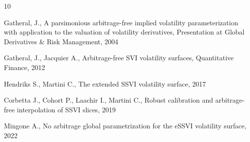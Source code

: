 \documentclass{amsart}
\theoremstyle{plain}
\numberwithin{equation}{section}
\begin{document}
\begin{thebibliography}{10}

 Gatheral, J., A parsimonious arbitrage-free implied volatility parameterization with application to the valuation of volatility derivatives, Presentation at Global Derivatives \& Risk Management, 2004

 Gatheral, J., Jacquier A., Arbitrage-free SVI volatility surfaces, Quantitative Finance, 2012

 Hendriks S., Martini C., The extended SSVI volatility surface, 2017

 Corbetta J., Cohort P., Laachir I., Martini C., Robust calibration and arbitrage-free interpolation of SSVI slices, 2019

 Mingone A., No arbitrage global parametrization for the eSSVI volatility surface, 2022

\end{thebibliography}
\end{document}
